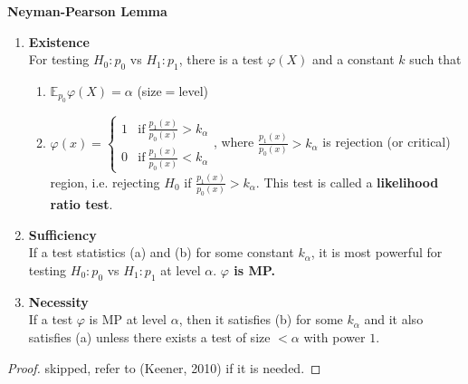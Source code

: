 \begin{lemma}\label{lem:nplemma}
    \textbf{Neyman-Pearson Lemma}\\
    \begin{enumerate}[{(i)}]
        \item \textbf{Existence}\\
        For testing $H_0:p_0$ vs $H_1:p_1$,
        there is a test $\varphi(X)$ and a constant $k$ such that
        \begin{enumerate}[{a)}]
            \item $\mathbb{E}_{p_0}\varphi(X)=\alpha$ (size$=$level)
            \item $\varphi(x)=\left\{\begin{array}{ll}
                1 & \text{if}~\frac{p_1(x)}{p_0(x)}>k_\alpha \\
                0 & \text{if}~\frac{p_1(x)}{p_0(x)}<k_\alpha
            \end{array}\right.$,
            where $\frac{p_1(x)}{p_0(x)}>k_\alpha$ is rejection (or critical) region, 
            i.e. rejecting $H_0$ if $\frac{p_1(x)}{p_0(x)}>k_\alpha$.
            This test is called a \textbf{likelihood ratio test}.
        \end{enumerate}
        \item \textbf{Sufficiency}\\
        If a test statistics (a) and (b) for some constant $k_\alpha$,
        it is most powerful for testing $H_0:p_0$ vs $H_1:p_1$ at level $\alpha$.
        \textbf{$\varphi$ is MP.}
        \item \textbf{Necessity}\\
        If a test $\varphi$ is MP at level $\alpha$,
        then it satisfies (b) for some $k_\alpha$ and it also satisfies (a)
        unless there exists a test of size $<\alpha$ with power $1$.
    \end{enumerate}
\end{lemma}
\begin{proof}
    skipped, refer to (Keener, 2010) if it is needed.
\end{proof}

